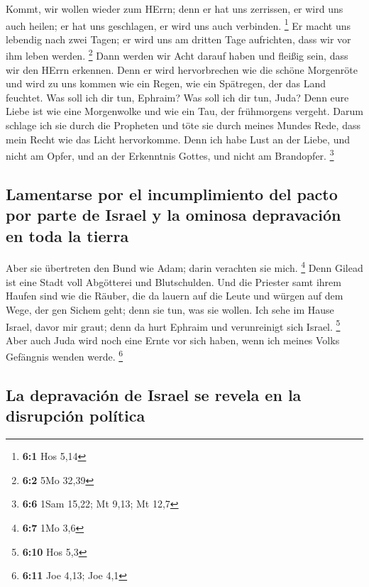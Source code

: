  Kommt, wir wollen wieder zum HErrn; denn er hat uns
zerrissen, er wird uns auch heilen; er hat uns geschlagen, er wird uns
auch verbinden. \footnote{\textbf{6:1} Hos 5,14}  Er macht
uns lebendig nach zwei Tagen; er wird uns am dritten Tage aufrichten,
dass wir vor ihm leben werden. \footnote{\textbf{6:2} 5Mo 32,39}
 Dann werden wir Acht darauf haben und fleißig sein, dass
wir den HErrn erkennen. Denn er wird hervorbrechen wie die schöne
Morgenröte und wird zu uns kommen wie ein Regen, wie ein Spätregen, der
das Land feuchtet.  Was soll ich dir tun, Ephraim? Was
soll ich dir tun, Juda? Denn eure Liebe ist wie eine Morgenwolke und wie
ein Tau, der frühmorgens vergeht.  Darum schlage ich sie
durch die Propheten und töte sie durch meines Mundes Rede, dass mein
Recht wie das Licht hervorkomme.  Denn ich habe Lust an
der Liebe, und nicht am Opfer, und an der Erkenntnis Gottes, und nicht
am Brandopfer. \footnote{\textbf{6:6} 1Sam 15,22; Mt 9,13; Mt 12,7}

\hypertarget{lamentarse-por-el-incumplimiento-del-pacto-por-parte-de-israel-y-la-ominosa-depravaciuxf3n-en-toda-la-tierra}{%
\subsection{Lamentarse por el incumplimiento del pacto por parte de
Israel y la ominosa depravación en toda la
tierra}\label{lamentarse-por-el-incumplimiento-del-pacto-por-parte-de-israel-y-la-ominosa-depravaciuxf3n-en-toda-la-tierra}}

 Aber sie übertreten den Bund wie Adam; darin verachten
sie mich. \footnote{\textbf{6:7} 1Mo 3,6}  Denn Gilead ist
eine Stadt voll Abgötterei und Blutschulden.  Und die
Priester samt ihrem Haufen sind wie die Räuber, die da lauern auf die
Leute und würgen auf dem Wege, der gen Sichem geht; denn sie tun, was
sie wollen.  Ich sehe im Hause Israel, davor mir graut;
denn da hurt Ephraim und verunreinigt sich Israel. \footnote{\textbf{6:10}
  Hos 5,3}  Aber auch Juda wird noch eine Ernte vor sich
haben, wenn ich meines Volks Gefängnis wenden werde. \footnote{\textbf{6:11}
  Joe 4,13; Joe 4,1}

\hypertarget{la-depravaciuxf3n-de-israel-se-revela-en-la-disrupciuxf3n-poluxedtica}{%
\subsection{La depravación de Israel se revela en la disrupción
política}\label{la-depravaciuxf3n-de-israel-se-revela-en-la-disrupciuxf3n-poluxedtica}}

